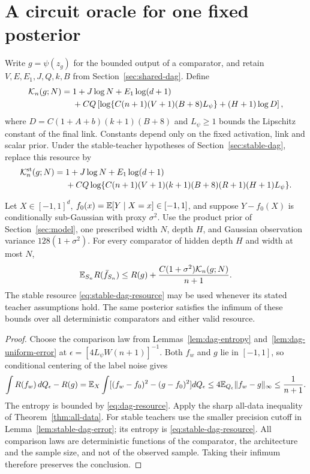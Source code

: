 \section{A circuit oracle for one fixed posterior}
\label{sec:dag-oracle}
Write $g=\psi(z_g)$ for the bounded output of a comparator, and retain
$V,E,E_1,J,Q,k,B$ from Section~\ref{sec:shared-dag}. Define
\begin{align}
 \mathcal K_n(g;N)
 ={}&1+J\log N+E_1\log(d+1)\notag\\
 &+C Q\left[\log\{C(n+1)(V+1)(B+8)L_\psi\}
                  +(H+1)\log D\right],
 \label{eq:dag-resource}
\end{align}
where $D=C(1+A+b)(k+1)(B+8)$ and $L_\psi\ge1$ bounds the Lipschitz constant of the final link. Constants depend only on the fixed activation, link and scalar prior. Under the stable-teacher hypotheses of Section~\ref{sec:stable-dag}, replace this resource by
\begin{align}
 \mathcal K^{\rm st}_n(g;N)
 ={}&1+J\log N+E_1\log(d+1)\notag\\
 &+C Q\log\{C(n+1)(V+1)(k+1)(B+8)(R+1)(H+1)L_\psi\}.
 \label{eq:stable-dag-resource}
\end{align}

\begin{theorem}
\label{thm:dag-statistical}
Let $X\in[-1,1]^d$, $f_0(x)=\mathbb E[Y\mid X=x]\in[-1,1]$, and suppose $Y-f_0(X)$ is conditionally sub-Gaussian with proxy $\sigma^2$. Use the product prior of Section~\ref{sec:model}, one prescribed width $N$, depth $H$, and Gaussian observation variance $128(1+\sigma^2)$. For every comparator of hidden depth $H$ and width at most $N$,
\[
 \mathbb E_{S_n} R(\bar f_{S_n})
 \le R(g)+\frac{C(1+\sigma^2)\mathcal K_n(g;N)}{n+1}.
\]
The stable resource \eqref{eq:stable-dag-resource} may be used whenever its stated teacher assumptions hold. The same posterior satisfies the infimum of these bounds over all deterministic comparators and either valid resource.
\end{theorem}
\begin{proof}
Choose the comparison law from Lemmas~\ref{lem:dag-entropy} and~\ref{lem:dag-uniform-error} at
$\epsilon=[4L_\psi W(n+1)]^{-1}$. Both $f_w$ and $g$ lie in $[-1,1]$, so conditional centering of the label noise gives
\[
 \int R(f_w)\,dQ_\epsilon-R(g)
 =\mathbb E_X\int[(f_w-f_0)^2-(g-f_0)^2]dQ_\epsilon
 \le4\mathbb E_{Q_\epsilon}\|f_w-g\|_\infty
 \le\frac1{n+1}.
\]
The entropy is bounded by \eqref{eq:dag-resource}. Apply the sharp all-data inequality of Theorem~\ref{thm:all-data}. For stable teachers use the smaller precision cutoff in Lemma~\ref{lem:stable-dag-error}; its entropy is \eqref{eq:stable-dag-resource}. All comparison laws are deterministic functions of the comparator, the architecture and the sample size, and not of the observed sample. Taking their infimum therefore preserves the conclusion.
\end{proof}

